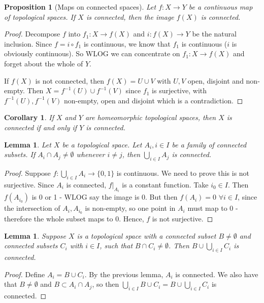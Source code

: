 \documentclass{article}
\theoremstyle{definition}
\theoremstyle{plain}%
\newtheorem{lem}[thm]{Lemma}
\newtheorem{prop}[thm]{Proposition}
\newtheorem*{cor}{Corollary}
\theoremstyle{remark}
\newcommand{\union}{\cup}
\newcommand{\Union}{\bigcup}
\newcommand{\intersection}{\cap}
\begin{document}
\begin{prop}[Maps on connected spaces]\label{Maps on connected spaces}
    Let $f:X \to Y$ be a continuous map of topological spaces. If $X$ is connected, then the image $f(X)$ is connected.
\end{prop}

\begin{proof}
    Decompose $f$ into $f_1: X \to f(X)$ and $i : f(X) \to Y$ be the natural inclusion. Since $f = i \circ f_1$ is continuous, we know that $f_1$ is continuous ($i$ is obviously continuous). So WLOG we can concentrate on $f_1 : X \to f(X)$ and forget about the whole of $Y$.
    
    If $f(X)$ is not connected, then $f(X) = U \union V$ with $U,V$ open, disjoint and non-empty. Then $X = f^{-1}(U) \union f^{-1}(V)$ since $f_1$ is surjective, with $f^{-1}(U), f^{-1}(V)$ non-empty, open and disjoint which is a contradiction.
\end{proof}

\begin{cor}
    If $X$ and $Y$ are homeomorphic topological spaces, then $X$ is connected if and only if $Y$ is connected.
\end{cor}

\begin{lem}
    Let $X$ be a topological space. Let $A_i, i \in I$ be a family of connected subsets. If $A_i \intersection A_j \ne \emptyset$ whenever $i \ne j$, then $\Union_{i \in I} A_j$ is connected.
\end{lem}

\begin{proof}
    Suppose $f : \Union_{i \in I} A_i \to \{0,1\}$ is continuous. We need to prove this is not surjective. Since $A_i$ is connected, $f|_{A_i}$ is a constant function. Take $i_0 \in I$. Then $f(A_{i_0})$ is 0 or 1 - WLOG say the image is 0. But then $f(A_i) = 0$ $\forall i \in I$, since the intersection of $A_i, A_{i_0}$ is non-empty, so one point in $A_i$ must map to 0 - therefore the whole subset maps to 0. Hence, $f$ is not surjective.
\end{proof}

\begin{lem}
    Suppose $X$ is a topological space with a connected subset $B \ne \emptyset$ and connected subsets $C_i$ with $i \in I$, such that $B \intersection C_i \ne \emptyset$. Then $B \union \Union_{i \in I} C_i$ is connected.
\end{lem}

\begin{proof}
    Define $A_i = B \union C_i$. By the previous lemma, $A_i$ is connected. We also have that $B \ne \emptyset$ and $B \subset A_i \intersection A_j$, so then $\Union_{i \in I} B \union C_i = B \union \Union_{i \in I} C_i$ is connected.
\end{proof}
\end{document}
